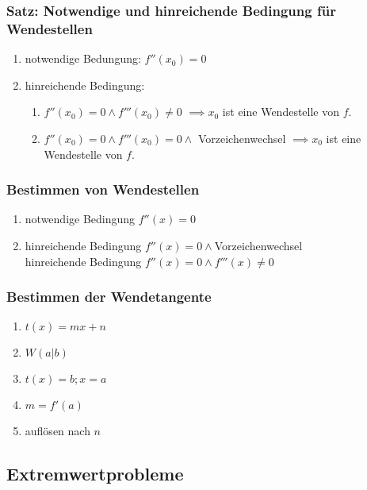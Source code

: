 \documentclass{article}
\begin{document}
  \subsubsection{Satz: Notwendige und hinreichende Bedingung für Wendestellen}
  \begin{enumerate}
  	\item notwendige Bedungung: $f''(x_0) = 0$
  	\item hinreichende Bedingung: 
  	\begin{enumerate}
  		\item $f''(x_0) = 0 \land f'''(x_0) \neq 0$
  		\newline
  		$\implies x_0$ ist eine Wendestelle von $f$.
  		\item $f''(x_0) = 0 \land f'''(x_0) = 0 \land$ Vorzeichenwechsel
  		\newline
  		$\implies x_0$ ist eine Wendestelle von $f$.
  	\end{enumerate}
  \end{enumerate}
  
  \subsubsection{Bestimmen von Wendestellen}
  \begin{enumerate}
  	\item notwendige Bedingung $f''(x) = 0$
  	\item hinreichende Bedingung $f''(x) = 0 \land$Vorzeichenwechsel \\
  	hinreichende Bedingung $f''(x) = 0 \land f'''(x) \neq 0$
  \end{enumerate}
  
  \subsubsection{Bestimmen der Wendetangente}
  \begin{enumerate}
  	\item $t(x) = m x + n$
  	\item $W(a|b)$
  	\item $t(x) = b; x = a$
  	\item $m = f'(a)$
  	\item auflösen nach $n$
  \end{enumerate}
  
  \subsection{Extremwertprobleme}
  
\end{document}
